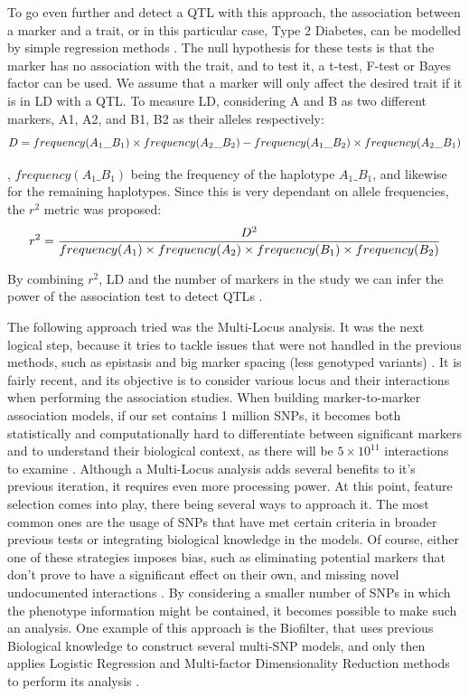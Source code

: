 To go even further and detect a \gls{QTL} with this approach, the association between a marker and a trait, or in this particular case, Type 2 Diabetes, can be modelled by simple regression methods \cite{haley1992simple}. The null hypothesis for these tests is that the marker has no association with the trait, and to test it, a t-test, F-test or Bayes factor can be used. We assume that a marker will only affect the desired trait if it is in \gls{LD} with a \gls{QTL}. To measure \gls{LD}, considering A and B as two different markers, A1, A2, and B1, B2 as their alleles respectively:
\begin{equation}
D = frequency(A_1\_B_1)\times frequency(A_2\_B_2) - frequency(A_1\_B_2)\times frequency(A_2\_B_1) \\
\end{equation}

, $frequency(A_1\_B_1)$ being the frequency of the haplotype $A_1\_B_1$, and likewise for the remaining haplotypes. Since this is very dependant on allele frequencies, the $r^2$ metric was proposed:
\begin{equation}
r^2 = \frac{D^2}{frequency(A_1)\times frequency(A_2)\times frequency(B_1)\times frequency(B_2)}\\
\end{equation}

By combining $r^2$, LD and the number of markers in the study we can infer the power of the association test to detect \gls{QTL}s \cite{hill1968linkage,visscher201710}. 

The following approach tried was the Multi-Locus analysis. It was the next logical step, because it tries to tackle issues that were not handled in the previous methods, such as epistasis and big marker spacing (less genotyped variants) \cite{mooney2012ga}. It is fairly recent, and its objective is to consider various locus and their interactions when performing the association studies. When building marker-to-marker association models, if our set contains 1 million \gls{SNP}s, it becomes both statistically and computationally hard to differentiate between significant markers and to understand their biological context, as there will be $5\times10^{11}$ interactions to examine \cite{turner2011knowledge}. Although a Multi-Locus analysis adds several benefits to it's previous iteration, it requires even more processing power. At this point, feature selection comes into play, there being several ways to approach it. The most common ones are the usage of \gls{SNP}s that have met certain criteria in broader previous tests or integrating biological knowledge in the models. Of course, either one of these strategies imposes bias, such as eliminating potential markers that don't prove to have a significant effect on their own, and missing novel undocumented interactions \cite{carlson2004mapping}. By considering a smaller number of \gls{SNP}s in which the phenotype information might be contained, it becomes possible to make such an analysis. One example of this approach is the Biofilter, that uses previous Biological knowledge to construct several multi-SNP models, and only then applies Logistic Regression and Multi-factor Dimensionality Reduction methods to perform its analysis \cite{bush2012genome,bush2009biofilter}.

